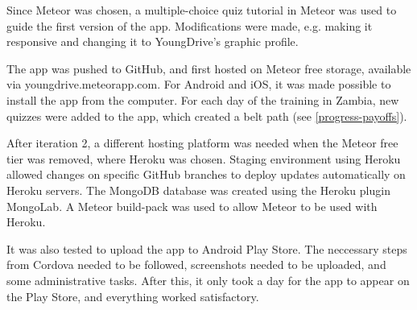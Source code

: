 
Since Meteor was chosen, a multiple-choice quiz tutorial in Meteor was used to guide the first version of the app. Modifications were made, e.g. making it responsive and changing it to YoungDrive's graphic profile.

The app was pushed to GitHub, and first hosted on Meteor free storage, available via youngdrive.meteorapp.com. For Android and iOS, it was made possible to install the app from the computer.  For each day of the training in Zambia, new quizzes were added to the app, which created a belt path (see \ref{progress-payoffs}).

After iteration 2, a different hosting platform was needed when the Meteor free tier was removed, where Heroku was chosen. Staging environment using Heroku allowed changes on specific GitHub branches to deploy updates automatically on Heroku servers. The MongoDB database was created using the Heroku plugin MongoLab. A Meteor build-pack was used to allow Meteor to be used with Heroku.

It was also tested to upload the app to Android Play Store. The neccessary steps from Cordova needed to be followed, screenshots needed to be uploaded, and some administrative tasks. After this, it only took a day for the app to appear on the Play Store, and everything worked satisfactory.

